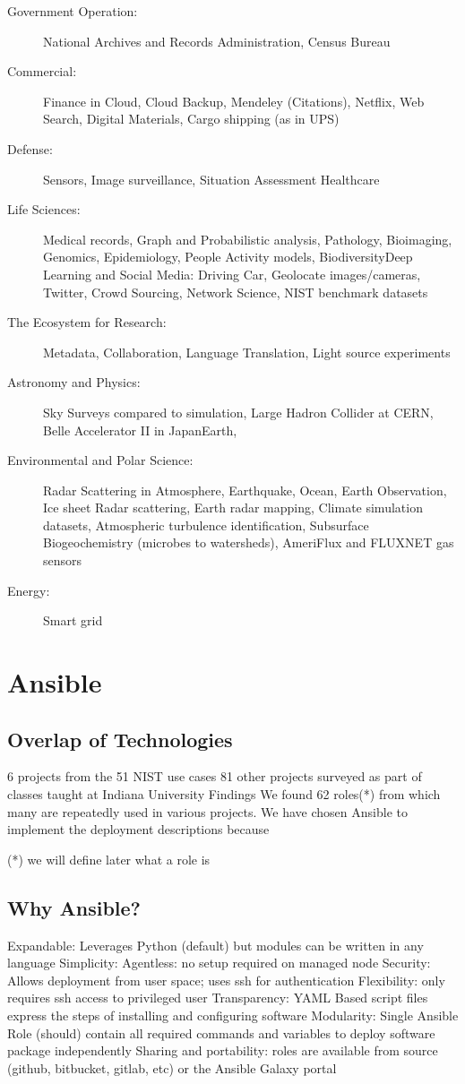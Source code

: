\begin{description}
\item[Government Operation:] National Archives and Records Administration, Census Bureau
\item[Commercial:] Finance in Cloud, Cloud Backup, Mendeley (Citations), Netflix, Web Search, Digital Materials, Cargo shipping (as in UPS)
\item[Defense:] Sensors, Image surveillance, Situation Assessment Healthcare
\item[Life Sciences:] Medical records, Graph and Probabilistic analysis, Pathology, Bioimaging, Genomics, Epidemiology, People Activity models, BiodiversityDeep Learning and Social Media: Driving Car, Geolocate images/cameras, Twitter, Crowd Sourcing, Network Science, NIST benchmark datasets
\item[The Ecosystem for Research:] Metadata, Collaboration, Language Translation, Light source experiments
\item[Astronomy and Physics:] Sky Surveys compared to simulation, Large Hadron Collider at CERN, Belle Accelerator II in JapanEarth,
\item[Environmental and Polar Science:] Radar Scattering in Atmosphere, Earthquake, Ocean, Earth Observation, Ice sheet Radar scattering, Earth radar mapping, Climate simulation datasets, Atmospheric turbulence identification, Subsurface Biogeochemistry (microbes to watersheds), AmeriFlux and FLUXNET gas sensors
\item[Energy:] Smart grid
\end{description}

\section{Ansible}

\subsection{Overlap of Technologies}
6 projects from the 51 NIST use cases
81 other projects surveyed as part of classes taught at Indiana University
Findings
We found 62 roles(*) from which many are repeatedly used in various projects. 
We have chosen Ansible to implement the deployment descriptions because 

(*) we will define later what a role is

\subsection{Why Ansible?}
Expandable: Leverages Python (default) but modules can be written in any language
Simplicity: 
Agentless: no setup required on managed node
Security: Allows deployment from user space; uses ssh for authentication
Flexibility: only requires ssh access to privileged user
Transparency: YAML Based script files express the steps of installing and configuring software
Modularity: Single Ansible Role (should) contain all required commands and variables to deploy software package independently
Sharing and portability: roles are available from source (github, bitbucket, gitlab, etc) or the Ansible Galaxy portal

